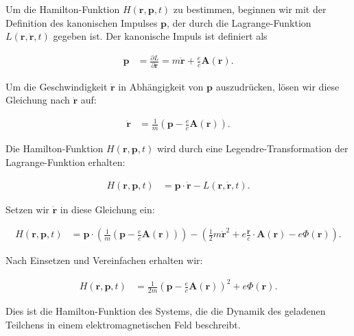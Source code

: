 Um die Hamilton-Funktion \( H(\mathbf{r}, \mathbf{p}, t) \) zu bestimmen, beginnen wir mit der Definition des kanonischen Impulses \(\mathbf{p}\), der durch die Lagrange-Funktion \( L(\mathbf{r}, \dot{\mathbf{r}}, t) \) gegeben ist. Der kanonische Impuls ist definiert als

\begin{align*}
\mathbf{p} &= \frac{\partial L}{\partial \dot{\mathbf{r}}} = m \dot{\mathbf{r}} + \frac{e}{c} \mathbf{A}(\mathbf{r}).
\end{align*}

Um die Geschwindigkeit \(\dot{\mathbf{r}}\) in Abhängigkeit von \(\mathbf{p}\) auszudrücken, lösen wir diese Gleichung nach \(\dot{\mathbf{r}}\) auf:

\begin{align*}
\dot{\mathbf{r}} &= \frac{1}{m} \left( \mathbf{p} - \frac{e}{c} \mathbf{A}(\mathbf{r}) \right).
\end{align*}

Die Hamilton-Funktion \( H(\mathbf{r}, \mathbf{p}, t) \) wird durch eine Legendre-Transformation der Lagrange-Funktion erhalten:

\begin{align*}
H(\mathbf{r}, \mathbf{p}, t) &= \mathbf{p} \cdot \dot{\mathbf{r}} - L(\mathbf{r}, \dot{\mathbf{r}}, t).
\end{align*}

Setzen wir \(\dot{\mathbf{r}}\) in diese Gleichung ein:

\begin{align*}
H(\mathbf{r}, \mathbf{p}, t) &= \mathbf{p} \cdot \left( \frac{1}{m} \left( \mathbf{p} - \frac{e}{c} \mathbf{A}(\mathbf{r}) \right) \right) - \left( \frac{1}{2} m \dot{\mathbf{r}}^2 + e \frac{\dot{\mathbf{r}}}{c} \cdot \mathbf{A}(\mathbf{r}) - e \Phi(\mathbf{r}) \right).
\end{align*}

Nach Einsetzen und Vereinfachen erhalten wir:

\begin{align*}
H(\mathbf{r}, \mathbf{p}, t) &= \frac{1}{2m} \left( \mathbf{p} - \frac{e}{c} \mathbf{A}(\mathbf{r}) \right)^2 + e \Phi(\mathbf{r}).
\end{align*}

Dies ist die Hamilton-Funktion des Systems, die die Dynamik des geladenen Teilchens in einem elektromagnetischen Feld beschreibt.

